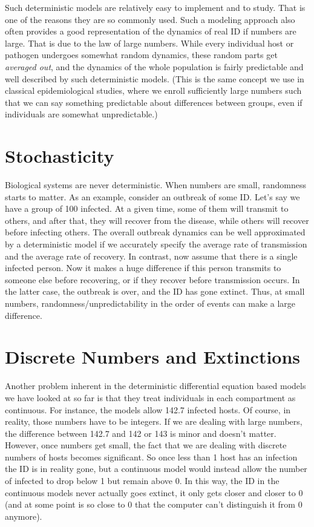 \documentclass[]{book}
\theoremstyle{definition}
\theoremstyle{definition}
\theoremstyle{definition}
\theoremstyle{remark}
\begin{document}
Such deterministic models are relatively easy to implement and to study.
That is one of the reasons they are so commonly used. Such a modeling
approach also often provides a good representation of the dynamics of
real ID if numbers are large. That is due to the law of large numbers.
While every individual host or pathogen undergoes somewhat random
dynamics, these random parts get \emph{averaged out}, and the dynamics
of the whole population is fairly predictable and well described by such
deterministic models. (This is the same concept we use in classical
epidemiological studies, where we enroll sufficiently large numbers such
that we can say something predictable about differences between groups,
even if individuals are somewhat unpredictable.)

\hypertarget{stochasticity}{%
\section{Stochasticity}\label{stochasticity}}

Biological systems are never deterministic. When numbers are small,
randomness starts to matter. As an example, consider an outbreak of some
ID. Let's say we have a group of 100 infected. At a given time, some of
them will transmit to others, and after that, they will recover from the
disease, while others will recover before infecting others. The overall
outbreak dynamics can be well approximated by a deterministic model if
we accurately specify the average rate of transmission and the average
rate of recovery. In contrast, now assume that there is a single
infected person. Now it makes a huge difference if this person transmits
to someone else before recovering, or if they recover before
transmission occurs. In the latter case, the outbreak is over, and the
ID has gone extinct. Thus, at small numbers, randomness/unpredictability
in the order of events can make a large difference.

\hypertarget{discrete-numbers-and-extinctions}{%
\section{Discrete Numbers and
Extinctions}\label{discrete-numbers-and-extinctions}}

Another problem inherent in the deterministic differential equation
based models we have looked at so far is that they treat individuals in
each compartment as continuous. For instance, the models allow 142.7
infected hosts. Of course, in reality, those numbers have to be
integers. If we are dealing with large numbers, the difference between
142.7 and 142 or 143 is minor and doesn't matter. However, once numbers
get small, the fact that we are dealing with discrete numbers of hosts
becomes significant. So once less than 1 host has an infection the ID is
in reality gone, but a continuous model would instead allow the number
of infected to drop below 1 but remain above 0. In this way, the ID in
the continuous models never actually goes extinct, it only gets closer
and closer to 0 (and at some point is so close to 0 that the computer
can't distinguish it from 0 anymore).
\end{document}
